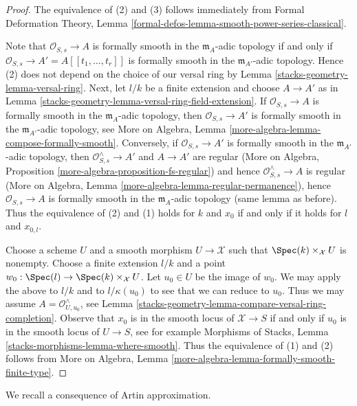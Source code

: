 \begin{proof}
The equivalence of (2) and (3) follows immediately from
Formal Deformation Theory, Lemma
\ref{formal-defos-lemma-smooth-power-series-classical}.

\medskip\noindent
Note that $\mathcal{O}_{S, s} \to A$ is formally smooth in the
$\mathfrak m_A$-adic topology if and only if
$\mathcal{O}_{S, s} \to A' = A[[t_1, \ldots, t_r]]$
is formally smooth in the $\mathfrak m_{A'}$-adic topology.
Hence (2) does not depend on the choice
of our versal ring by Lemma \ref{stacks-geometry-lemma-versal-ring}.
Next, let $l/k$ be a finite extension and choose
$A \to A'$ as in Lemma \ref{stacks-geometry-lemma-versal-ring-field-extension}.
If $\mathcal{O}_{S, s} \to A$ is formally smooth in the
$\mathfrak m_A$-adic topology, then $\mathcal{O}_{S, s} \to A'$
is formally smooth in the $\mathfrak m_{A'}$-adic topology, see
More on Algebra, Lemma \ref{more-algebra-lemma-compose-formally-smooth}.
Conversely, if $\mathcal{O}_{S, s} \to A'$
is formally smooth in the $\mathfrak m_{A'}$-adic topology,
then $\mathcal{O}_{S, s}^\wedge \to A'$ and $A \to A'$ are regular
(More on Algebra, Proposition \ref{more-algebra-proposition-fs-regular})
and hence $\mathcal{O}_{S, s}^\wedge \to A$ is regular
(More on Algebra, Lemma \ref{more-algebra-lemma-regular-permanence}),
hence $\mathcal{O}_{S, s} \to A$ is formally smooth in the
$\mathfrak m_A$-adic topology (same lemma as before).
Thus the equivalence of (2) and (1) holds for
$k$ and $x_0$ if and only if it holds for $l$ and $x_{0, l}$.

\medskip\noindent
Choose a scheme $U$ and a smooth morphism $U \to \mathcal{X}$ such
that $\Spec(k) \times_\mathcal{X} U$ is nonempty. Choose a finite
extension $l/k$ and a point $w_0 : \Spec(l) \to \Spec(k) \times_\mathcal{X} U$.
Let $u_0 \in U$ be the image of $w_0$.
We may apply the above to $l/k$ and to $l/\kappa(u_0)$
to see that we can reduce to $u_0$. Thus we may assume
$A = \mathcal{O}_{U, u_0}^\wedge$, see
Lemma \ref{stacks-geometry-lemma-compare-versal-ring-completion}.
Observe that $x_0$ is in the smooth locus of $\mathcal{X} \to S$
if and only if $u_0$ is in the smooth locus of $U \to S$, see for example
Morphisms of Stacks, Lemma \ref{stacks-morphisms-lemma-where-smooth}.
Thus the equivalence of (1) and (2) follows from
More on Algebra, Lemma \ref{more-algebra-lemma-formally-smooth-finite-type}.
\end{proof}

We recall a consequence of Artin approximation.

